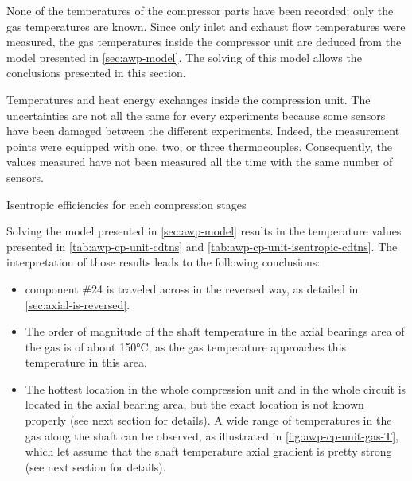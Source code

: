 None of the temperatures of the compressor parts have been recorded;
only the gas temperatures are known. Since only inlet and exhaust flow
temperatures were measured, the gas temperatures inside the
compressor unit are deduced from the model presented in
\cref{sec:awp-model}. The solving of this model allows the conclusions
presented in this section.

\begin{table}
  \footnotesize
  \begin{center}
    
  \end{center}
  \caption{Temperatures and heat energy exchanges inside the
    compression unit. The uncertainties are not all the same for every
    experiments because some sensors have been damaged between the different
    experiments. Indeed, the measurement points were equipped with one,
    two, or three thermocouples. Consequently, the values measured
    have not been measured all the time with the same number of sensors.}
  \label{tab:awp-cp-unit-cdtns}
\end{table}

\begin{table}
  \footnotesize
  \begin{center}
    \resizebox{\linewidth}{!}{
    }
  \end{center}
  \caption{Isentropic efficiencies for each compression stages}
  \label{tab:awp-cp-unit-isentropic-cdtns}
\end{table}

Solving the model presented in \cref{sec:awp-model} results in the
temperature values presented in \cref{tab:awp-cp-unit-cdtns} and
\cref{tab:awp-cp-unit-isentropic-cdtns}. The interpretation of those
results leads to the following conclusions:

\begin{itemize}
\item component \#24 is traveled across in the reversed way, as
  detailed in \cref{sec:axial-is-reversed}.
\item The order of magnitude of the shaft temperature in the axial
  bearings area of the gas is of about
  150\si{\degreeCelsius}, as the gas temperature approaches this temperature
  in this area.
\item The hottest location in the whole compression unit and in the
  whole circuit is located in the axial bearing area, but the exact
  location is not known properly (see next section for details). A
  wide range of temperatures in the gas along the shaft can be
  observed, as illustrated in \cref{fig:awp-cp-unit-gas-T}, which let
  assume that the shaft temperature axial gradient is pretty strong
  (see next section for details).
\end{itemize}

